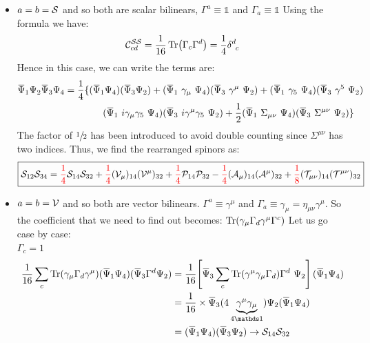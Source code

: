 \begin{itemize}
    \item $a=b=\mathcal S$ and so both are scalar bilinears, $\Gamma^a \equiv \mathds{1}$ and $\Gamma_a \equiv \mathds{1}$
    Using the formula we have:
    $$\SC^{\Ss\Ss}_{cd} =\frac{1}{16} \Tr(\Gamma_c\Gamma^d)=\frac{1}{4}\delt{d}{c}$$
    Hence in this case, we can write the terms are:
    \begin{align*}
        \dadj{\Psi}_1 {\Psi}_2\dadj{\Psi}_3 \Psi_4 &= \frac{1}{4}\{ (\dadj{\Psi}_1 {\Psi}_4)(\dadj{\Psi}_3 \Psi_2) + (\bilin{1}{4}{\gamma_\mu})(\bilin{3}{2}{\gamma^\mu}) +(\bilin{1}{4}{\gamma_5})(\bilin{3}{2}{\gamma^5})\\ &\qquad\qquad (\bilin{1}{4}{i \gamma_\mu\gamma_5})(\bilin{3}{2}{i\gamma^\mu\gamma_5}) + \frac{1}{2} (\bilin{1}{4}{ \Sigma_{\mu\nu}})(\bilin{3}{2}{\Sigma^{\mu\nu}})\}
    \end{align*}
    The factor of $\sfrac{1}{2}$ has been introduced to avoid double counting since $\Sigma^{\mu\nu}$ has two indices. Thus, we find the rearranged spinors as:
    $$\boxed{\Ss_{12}\Ss_{34} = \mathcolor{red}{\frac{1}{4}}\Ss_{14}\Ss_{32} +\mathcolor{red}{\frac{1}{4}}({\SV_{\mu}})_{14}({\SV^{\mu}})_{32}+ \mathcolor{red}{\frac{1}{4}}\SP_{14}\SP_{32}-\mathcolor{red}{\frac{1}{4}}({\SA_{\mu}})_{14}({\SA^{\mu}})_{32}+\mathcolor{red}{\frac{1}{8}}({\ST_{\mu\nu}})_{14}({\ST^{\mu\nu}})_{32} }$$
    \item $a=b=\mathcal V$ and so both are vector bilinears. $\Gamma^a \equiv \gamma^\mu$ and $\Gamma_a \equiv \gamma_\mu = \eta_{\mu\nu}\gamma^\mu$. So the coefficient that we need to find out becomes: $\Tr(\gamma_\mu \Gamma_d \gamma^\mu \Gamma^c)$ Let us go case by case:\\[0.2cm]
    \underline{$\Gamma_c = 1$}
    \begin{align*}
        \frac{1}{16}\sum\limits_{c} \Tr(\gamma_\mu\Gamma_d \gamma^\mu ) (\dadj{\Psi}_1  \Psi_4)(\dadj{\Psi}_3\Gamma^d \Psi_2) &= \frac{1}{16}\qty[\dadj{\Psi}_3 \sum\limits_c \Tr( \gamma^\mu \gamma_\mu \Gamma_d )\Gamma^d\ \Psi_2](\dadj{\Psi}_1 \Psi_4) \\
        &=\frac{1}{16}\times  \dadj{\Psi}_3 (4\underbrace{ \gamma^\mu \gamma_\mu}_{4\iden})\Psi_2 (\dadj{\Psi}_1 \Psi_4)\\
        &=(\dadj{\Psi}_1 \Psi_4)(\dadj{\Psi}_3 \Psi_2) \rightarrow \Ss_{14}\Ss_{32}
    \end{align*}



\end{itemize}
